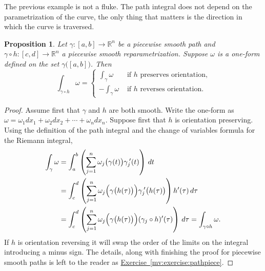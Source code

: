 \documentclass[12pt]{book}
\newcommand{\R}{{\mathbb{R}}}
\theoremstyle{plain}
\newtheorem{prop}[thm]{Proposition}
\theoremstyle{remark}
\theoremstyle{definition}
\theoremstyle{exercise}
\theoremstyle{example}
\newcommand{\exerciseref}[1]{\hyperref[#1]{Exercise~\ref*{#1}}}
\begin{document}
The previous example is not a fluke.
The path integral does not depend on the parametrization of
the curve, the only thing that matters is the direction in which the curve
is traversed.

\begin{prop} \label{mv:prop:pathintrepararam}
Let $\gamma \colon [a,b] \to \R^n$ be a piecewise smooth path and
$\gamma \circ h \colon [c,d] \to \R^n$ a piecewise smooth reparametrization.
Suppose $\omega$ is a one-form defined on the set $\gamma\bigl([a,b]\bigr)$.  Then
\begin{equation*}
\int_{\gamma \circ h} \omega =
\begin{cases}
\int_{\gamma} \omega & \text{ if $h$ preserves orientation,}\\
-\int_{\gamma} \omega & \text{ if $h$ reverses orientation.}
\end{cases}
\end{equation*}
\end{prop}

\begin{proof}
Assume first that $\gamma$ and $h$ are both smooth.
Write the one-form  as $\omega = \omega_1 dx_1 + \omega_2 dx_2 + \cdots +
\omega_n dx_n$.
Suppose first that $h$ is orientation preserving.  Using
the definition of the path integral and the change of variables
formula for the Riemann integral,
\begin{equation*}
\begin{split}
\int_{\gamma} \omega
& =
\int_a^b 
\left(
\sum_{j=1}^n
\omega_j\bigl(\gamma(t)\bigr) \gamma_j^{\:\prime}(t)
\right) \, dt
\\
& =
\int_c^d 
\left(
\sum_{j=1}^n
\omega_j\Bigl(\gamma\bigl(h(\tau)\bigr)\Bigr) \gamma_j^{\:\prime}\bigl(h(\tau)\bigr)
\right) h'(\tau) \, d\tau
\\
& =
\int_c^d 
\left(
\sum_{j=1}^n
\omega_j\Bigl(\gamma\bigl(h(\tau)\bigr)\Bigr) (\gamma_j \circ h)'(\tau)
\right) \, d\tau
=
\int_{\gamma \circ h} \omega .
\end{split}
\end{equation*}
If $h$ is orientation reversing it will swap the order of the limits on the
integral introducing a minus sign.  The details, along with finishing the proof for piecewise smooth
paths is left to the reader as \exerciseref{mv:exercise:pathpiece}.
\end{proof}
\end{document}
